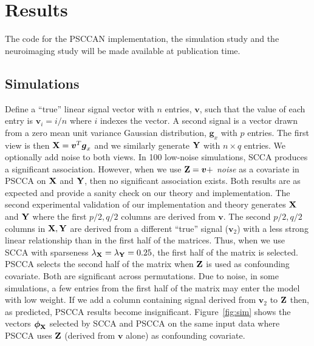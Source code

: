 \documentclass{llncs}
\newcommand{\X}{{\bf X}}
\newcommand{\Y}{{\bf Y}}
\newcommand{\Z}{{\bf Z}}
\newcommand{\bs}{\boldsymbol}
\begin{document}
\section{Results}
The code for the PSCCAN implementation, the simulation study and the
neuroimaging study will be made available at publication time. 
\subsection{Simulations} Define a ``true'' linear signal vector with
$n$ entries, ${\bs v}$, such that the value of each entry is ${\bs
v}_i=i/n$ where $i$ indexes the vector.  A second signal is a vector drawn from a zero mean unit
variance Gaussian distribution, ${\bs g_x}$ with $p$ entries.  The
first view is then $\X ={\bs v}^T {\bs g_x}$ and we similarly generate
$\Y $ with $n \times q$ entries.  We optionally add noise to both
views.  In 100 low-noise simulations, SCCA produces a significant
association.  However, when we use $\Z = {\bs v} + $ {\em noise} as a
covariate in PSCCA on $\X$ and $\Y$, then no significant association
exists.  Both results are as expected and provide a sanity check on
our theory and implementation.  The second experimental validation of
our implementation and theory generates $\X$ and $\Y$ where the first
$p/2, q/2$ columns are derived from ${\bs v}$.  The second $p/2, q/2$
columns in $\X, \Y$ are derived from a different ``true'' signal (${\bs v}_2$) with
a less strong linear relationship than in the first half of the
matrices.  Thus, when we use SCCA with sparseness
$\lambda_{\X}=\lambda_{\Y}=0.25$, the first half of the matrix is
selected.  PSCCA selects the second half of the matrix when $\Z$ is
used as confounding covariate.  Both are significant across permutations.  Due to
noise, in some simulations, a few entries from the first half of the
matrix may enter the model with low weight.  If we add a column containing signal derived from ${\bs
  v}_2$ to $\Z$ then, as predicted, PSCCA results become insignificant. Figure~\ref{fig:sim}
shows the vectors $\bs\phi_{\X}$ selected by SCCA and PSCCA on the
same input data where PSCCA uses $\Z$ (derived from ${\bs v}$ alone)
as confounding covariate. 
\vspace{-0.1in}
\end{document}
